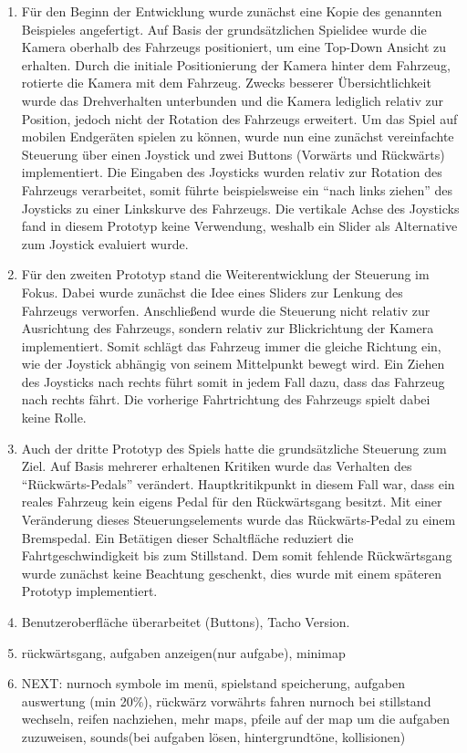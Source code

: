 	\begin{enumerate}[label=Prototyp \arabic*]
		\item{ Für den Beginn der Entwicklung wurde zunächst eine Kopie des genannten Beispieles angefertigt. Auf Basis der grundsätzlichen Spielidee wurde die Kamera oberhalb des Fahrzeugs positioniert, um eine Top-Down Ansicht zu erhalten. Durch die initiale Positionierung der Kamera hinter dem Fahrzeug, rotierte die Kamera mit dem Fahrzeug. Zwecks besserer Übersichtlichkeit wurde das Drehverhalten unterbunden und die Kamera lediglich relativ zur Position, jedoch nicht der Rotation des Fahrzeugs erweitert. Um das Spiel auf mobilen Endgeräten spielen zu können, wurde nun eine zunächst vereinfachte Steuerung über einen Joystick und zwei Buttons (Vorwärts und Rückwärts) implementiert. Die Eingaben des Joysticks wurden relativ zur Rotation des Fahrzeugs verarbeitet, somit führte beispielsweise ein \enquote{nach links ziehen} des Joysticks zu einer Linkskurve des Fahrzeugs. Die vertikale Achse des Joysticks fand in diesem Prototyp keine Verwendung, weshalb ein Slider als Alternative zum Joystick evaluiert wurde. }
		\item{ Für den zweiten Prototyp stand die Weiterentwicklung der Steuerung im Fokus. Dabei wurde zunächst die Idee eines Sliders zur Lenkung des Fahrzeugs verworfen. Anschließend wurde die Steuerung nicht relativ zur Ausrichtung des Fahrzeugs, sondern relativ zur Blickrichtung der Kamera implementiert. Somit schlägt das Fahrzeug immer die gleiche Richtung ein, wie der Joystick abhängig von seinem Mittelpunkt bewegt wird. Ein Ziehen des Joysticks nach rechts führt somit in jedem Fall dazu, dass das Fahrzeug nach rechts fährt. Die vorherige Fahrtrichtung des Fahrzeugs spielt dabei keine Rolle. }
		\item{Auch der dritte Prototyp des Spiels hatte die grundsätzliche Steuerung zum Ziel. Auf Basis mehrerer erhaltenen Kritiken wurde das Verhalten des \enquote{Rückwärts-Pedals} verändert. Hauptkritikpunkt in diesem Fall war, dass ein reales Fahrzeug kein eigens Pedal für den Rückwärtsgang besitzt. Mit einer Veränderung dieses Steuerungselements wurde das Rückwärts-Pedal zu einem Bremspedal. Ein Betätigen dieser Schaltfläche reduziert die Fahrtgeschwindigkeit bis zum Stillstand. Dem somit fehlende Rückwärtsgang wurde zunächst keine Beachtung geschenkt, dies wurde mit einem späteren Prototyp implementiert.}
		\item{ Benutzeroberfläche überarbeitet (Buttons), Tacho Version. }
		\item{ rückwärtsgang, aufgaben anzeigen(nur aufgabe), minimap }
		\item{NEXT: nurnoch symbole im menü, spielstand speicherung, aufgaben auswertung (min 20\%), rückwärz vorwährts fahren nurnoch bei stillstand wechseln, reifen nachziehen, mehr maps, pfeile auf der map um die aufgaben zuzuweisen, sounds(bei aufgaben lösen, hintergrundtöne, kollisionen) }
	\end{enumerate}
